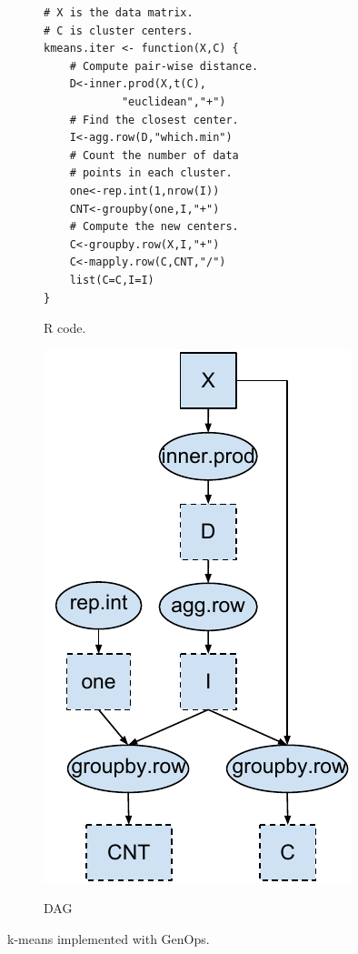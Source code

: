 \begin{figure}
\centering
	\footnotesize
	\begin{subfigure}{.25\textwidth}
	\vspace{20pt}
	\centering
	\begin{verbatim}
# X is the data matrix.
# C is cluster centers.
kmeans.iter <- function(X,C) {
	# Compute pair-wise distance.
	D<-inner.prod(X,t(C),
			"euclidean","+")
	# Find the closest center.
	I<-agg.row(D,"which.min")
	# Count the number of data
	# points in each cluster.
	one<-rep.int(1,nrow(I))
	CNT<-groupby(one,I,"+")
	# Compute the new centers.
	C<-groupby.row(X,I,"+")
	C<-mapply.row(C,CNT,"/")
	list(C=C,I=I)
}
	\end{verbatim}
	\label{fig:code}
	\caption{R code.}
	\end{subfigure}%
	\begin{subfigure}{.30\textwidth}
	\centering
	\vspace{25pt}
	\includegraphics[scale=0.6]{FlashMatrix_figs/DAG.pdf}
	\label{fig:dag}
	\caption{DAG}
	\end{subfigure}
  \vspace{-12pt}
	\caption{k-means implemented with GenOps.}
	\label{fig:kmeans}
  \vspace{-8pt}
\end{figure}

